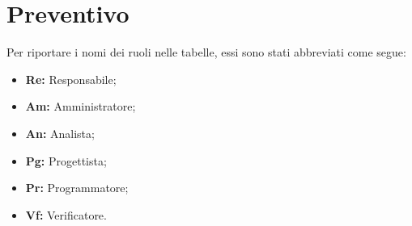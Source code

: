 \nonstopmode
\section{Preventivo}

Per riportare i nomi dei ruoli nelle tabelle, essi sono stati abbreviati come segue:
\begin{itemize}
  \item \textbf{Re:} Responsabile;
  \item \textbf{Am:} Amministratore;
  \item \textbf{An:} Analista;
  \item \textbf{Pg:} Progettista;
  \item \textbf{Pr:} Programmatore;
  \item \textbf{Vf:} Verificatore.
\end{itemize}




%
%
